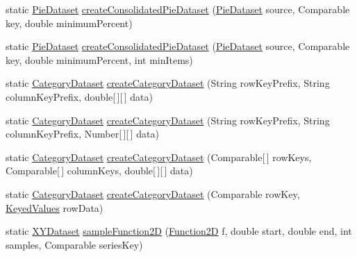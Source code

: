 \begin{DoxyCompactItemize}
\item 
static \mbox{\hyperlink{interfaceorg_1_1jfree_1_1data_1_1general_1_1_pie_dataset}{Pie\+Dataset}} \mbox{\hyperlink{classorg_1_1jfree_1_1data_1_1general_1_1_dataset_utilities_a8cf7fb0b464369b6d1b3b435a4c36d50}{create\+Consolidated\+Pie\+Dataset}} (\mbox{\hyperlink{interfaceorg_1_1jfree_1_1data_1_1general_1_1_pie_dataset}{Pie\+Dataset}} source, Comparable key, double minimum\+Percent)
\item 
static \mbox{\hyperlink{interfaceorg_1_1jfree_1_1data_1_1general_1_1_pie_dataset}{Pie\+Dataset}} \mbox{\hyperlink{classorg_1_1jfree_1_1data_1_1general_1_1_dataset_utilities_a5a417b827d0fcd6e5d3d51fb25f76160}{create\+Consolidated\+Pie\+Dataset}} (\mbox{\hyperlink{interfaceorg_1_1jfree_1_1data_1_1general_1_1_pie_dataset}{Pie\+Dataset}} source, Comparable key, double minimum\+Percent, int min\+Items)
\item 
static \mbox{\hyperlink{interfaceorg_1_1jfree_1_1data_1_1category_1_1_category_dataset}{Category\+Dataset}} \mbox{\hyperlink{classorg_1_1jfree_1_1data_1_1general_1_1_dataset_utilities_a6e90c2bf6df7ba645d3d630e2ee053a2}{create\+Category\+Dataset}} (String row\+Key\+Prefix, String column\+Key\+Prefix, double\mbox{[}$\,$\mbox{]}\mbox{[}$\,$\mbox{]} data)
\item 
static \mbox{\hyperlink{interfaceorg_1_1jfree_1_1data_1_1category_1_1_category_dataset}{Category\+Dataset}} \mbox{\hyperlink{classorg_1_1jfree_1_1data_1_1general_1_1_dataset_utilities_a76db539e36f46e9139d33c52935d147c}{create\+Category\+Dataset}} (String row\+Key\+Prefix, String column\+Key\+Prefix, Number\mbox{[}$\,$\mbox{]}\mbox{[}$\,$\mbox{]} data)
\item 
static \mbox{\hyperlink{interfaceorg_1_1jfree_1_1data_1_1category_1_1_category_dataset}{Category\+Dataset}} \mbox{\hyperlink{classorg_1_1jfree_1_1data_1_1general_1_1_dataset_utilities_af9fb7dd32c85d047342f7343ebc0a3ad}{create\+Category\+Dataset}} (Comparable\mbox{[}$\,$\mbox{]} row\+Keys, Comparable\mbox{[}$\,$\mbox{]} column\+Keys, double\mbox{[}$\,$\mbox{]}\mbox{[}$\,$\mbox{]} data)
\item 
static \mbox{\hyperlink{interfaceorg_1_1jfree_1_1data_1_1category_1_1_category_dataset}{Category\+Dataset}} \mbox{\hyperlink{classorg_1_1jfree_1_1data_1_1general_1_1_dataset_utilities_a1f3086f96e05894a9e2d002001878d5e}{create\+Category\+Dataset}} (Comparable row\+Key, \mbox{\hyperlink{interfaceorg_1_1jfree_1_1data_1_1_keyed_values}{Keyed\+Values}} row\+Data)
\item 
static \mbox{\hyperlink{interfaceorg_1_1jfree_1_1data_1_1xy_1_1_x_y_dataset}{X\+Y\+Dataset}} \mbox{\hyperlink{classorg_1_1jfree_1_1data_1_1general_1_1_dataset_utilities_ac1eabf95dc8c6a3d3d22b6a6c80eab43}{sample\+Function2D}} (\mbox{\hyperlink{interfaceorg_1_1jfree_1_1data_1_1function_1_1_function2_d}{Function2D}} f, double start, double end, int samples, Comparable series\+Key)

\end{DoxyCompactItemize}

